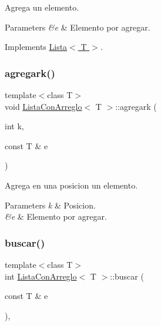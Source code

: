 Agrega un elemento. 


\begin{DoxyParams}{Parameters}
{\em \&e} & Elemento por agregar. \\
\hline
\end{DoxyParams}


Implements \hyperlink{class_lista}{Lista$<$ T $>$}.

\hypertarget{class_lista_con_arreglo_a742afe90aa461d9dafbf9579c6615c81}{}\label{class_lista_con_arreglo_a742afe90aa461d9dafbf9579c6615c81} 
\subsubsection{\texorpdfstring{agregark()}{agregark()}}
{\ttfamily template$<$class T$>$ \\
void \hyperlink{class_lista_con_arreglo}{Lista\+Con\+Arreglo}$<$ T $>$\+::agregark (\begin{DoxyParamCaption}\item[{int}]{k,  }\item[{const T \&}]{e }\end{DoxyParamCaption})\hspace{0.3cm}{\ttfamily [inline]}}



Agrega en una posicion un elemento. 


\begin{DoxyParams}{Parameters}
{\em k} & Posicion. \\
\hline
{\em \&e} & Elemento por agregar. \\
\hline
\end{DoxyParams}
\hypertarget{class_lista_con_arreglo_a93187f91395bd4a498624470524a40aa}{}\label{class_lista_con_arreglo_a93187f91395bd4a498624470524a40aa} 
\subsubsection{\texorpdfstring{buscar()}{buscar()}}
{\ttfamily template$<$class T$>$ \\
int \hyperlink{class_lista_con_arreglo}{Lista\+Con\+Arreglo}$<$ T $>$\+::buscar (\begin{DoxyParamCaption}\item[{const T \&}]{e }\end{DoxyParamCaption})\hspace{0.3cm}{\ttfamily [inline]}, {\ttfamily [virtual]}}



